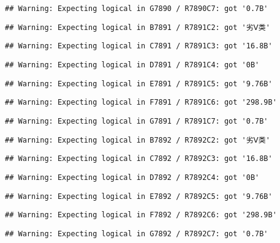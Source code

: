 \documentclass[
]{article}
\begin{document}
\begin{verbatim}
## Warning: Expecting logical in G7890 / R7890C7: got '0.7B'
\end{verbatim}

\begin{verbatim}
## Warning: Expecting logical in B7891 / R7891C2: got '劣Ⅴ类'
\end{verbatim}

\begin{verbatim}
## Warning: Expecting logical in C7891 / R7891C3: got '16.8B'
\end{verbatim}

\begin{verbatim}
## Warning: Expecting logical in D7891 / R7891C4: got '0B'
\end{verbatim}

\begin{verbatim}
## Warning: Expecting logical in E7891 / R7891C5: got '9.76B'
\end{verbatim}

\begin{verbatim}
## Warning: Expecting logical in F7891 / R7891C6: got '298.9B'
\end{verbatim}

\begin{verbatim}
## Warning: Expecting logical in G7891 / R7891C7: got '0.7B'
\end{verbatim}

\begin{verbatim}
## Warning: Expecting logical in B7892 / R7892C2: got '劣Ⅴ类'
\end{verbatim}

\begin{verbatim}
## Warning: Expecting logical in C7892 / R7892C3: got '16.8B'
\end{verbatim}

\begin{verbatim}
## Warning: Expecting logical in D7892 / R7892C4: got '0B'
\end{verbatim}

\begin{verbatim}
## Warning: Expecting logical in E7892 / R7892C5: got '9.76B'
\end{verbatim}

\begin{verbatim}
## Warning: Expecting logical in F7892 / R7892C6: got '298.9B'
\end{verbatim}

\begin{verbatim}
## Warning: Expecting logical in G7892 / R7892C7: got '0.7B'
\end{verbatim}
\end{document}
